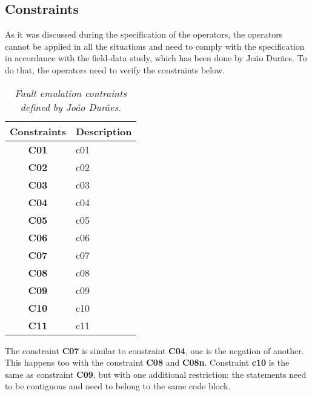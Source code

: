 \clearpage
\subsection{Constraints}

As it was discussed during the specification of the operators, the operators cannot be applied in all the situations and need to comply with the specification in accordance with the field-data study, which has been done by João Durães. To do that, the operators need to verify the constraints below.

\begin{table}[!ht]
\centering
\begin{tabular}{|c|p{12cm}|}
\hline
\textbf{Constraints}            & \multicolumn{1}{c|}{\textbf{Description}}                                     \\ \hline \hline
\textbf{C01}         			& \Acl{c01} \\ \hline
\textbf{C02}         			& \Acl{c02} \\ \hline
\textbf{C03}         			& \Acl{c03} \\ \hline
\textbf{C04}         			& \Acl{c04} \\ \hline
\textbf{C05}         			& \Acl{c05} \\ \hline
\textbf{C06}         			& \Acl{c06} \\ \hline
\textbf{C07}         			& \Acl{c07} \\ \hline
\textbf{C08}         			& \Acl{c08} \\ \hline
\textbf{C09}         			& \Acl{c09} \\ \hline
\textbf{C10}         			& \Acl{c10} \\ \hline
\textbf{C11}         			& \Acl{c11} \\ \hline
\end{tabular}
\caption{\small \sl Fault emulation contraints defined by João Durães.\label{tab:faultEmulationConstraintsDuraes}}
\end{table}

The constraint \textbf{C07} is similar to constraint \textbf{C04}, one is the negation of another. This happens too with the constraint \textbf{C08} and \textbf{C08n}.
Constraint \textbf{c10} is the same as constraint \textbf{C09}, but with one additional restriction: the statements need to be contiguous and need to belong to the same code block.

